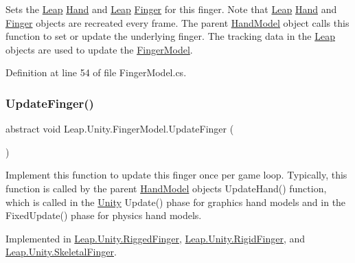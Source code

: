 Sets the \mbox{\hyperlink{namespace_leap_1_1_unity_1_1_leap}{Leap}} \mbox{\hyperlink{class_leap_1_1_hand}{Hand}} and \mbox{\hyperlink{namespace_leap_1_1_unity_1_1_leap}{Leap}} \mbox{\hyperlink{class_leap_1_1_finger}{Finger}} for this finger. Note that \mbox{\hyperlink{namespace_leap_1_1_unity_1_1_leap}{Leap}} \mbox{\hyperlink{class_leap_1_1_hand}{Hand}} and \mbox{\hyperlink{class_leap_1_1_finger}{Finger}} objects are recreated every frame. The parent \mbox{\hyperlink{class_leap_1_1_unity_1_1_hand_model}{Hand\+Model}} object calls this function to set or update the underlying finger. The tracking data in the \mbox{\hyperlink{namespace_leap_1_1_unity_1_1_leap}{Leap}} objects are used to update the \mbox{\hyperlink{class_leap_1_1_unity_1_1_finger_model}{Finger\+Model}}. 

Definition at line 54 of file Finger\+Model.\+cs.

\mbox{\label{class_leap_1_1_unity_1_1_finger_model_a9103f063172a8f99a9aa083407ada2a2}} 
\subsubsection{\texorpdfstring{UpdateFinger()}{UpdateFinger()}}
{\footnotesize\ttfamily abstract void Leap.\+Unity.\+Finger\+Model.\+Update\+Finger (\begin{DoxyParamCaption}{ }\end{DoxyParamCaption})\hspace{0.3cm}{\ttfamily [pure virtual]}}

Implement this function to update this finger once per game loop. Typically, this function is called by the parent \mbox{\hyperlink{class_leap_1_1_unity_1_1_hand_model}{Hand\+Model}} object\textquotesingle{}s Update\+Hand() function, which is called in the \mbox{\hyperlink{namespace_leap_1_1_unity}{Unity}} Update() phase for graphics hand models and in the Fixed\+Update() phase for physics hand models. 

Implemented in \mbox{\hyperlink{class_leap_1_1_unity_1_1_rigged_finger_affc59ee8e673ae2c2cf8c4222749f602}{Leap.\+Unity.\+Rigged\+Finger}}, \mbox{\hyperlink{class_leap_1_1_unity_1_1_rigid_finger_a92ed755907bd1cc5213b6277d7e2227d}{Leap.\+Unity.\+Rigid\+Finger}}, and \mbox{\hyperlink{class_leap_1_1_unity_1_1_skeletal_finger_a8b622787258cd44d6cd4e20e8cb2a6a7}{Leap.\+Unity.\+Skeletal\+Finger}}.



